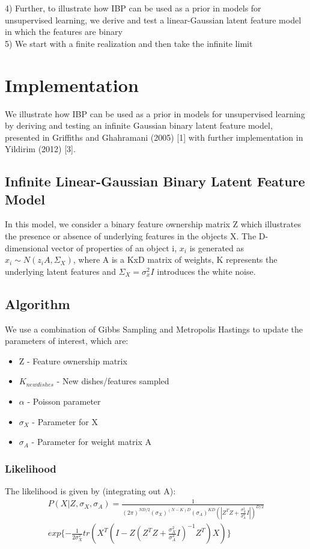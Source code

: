 \documentclass[11pt]{article}
\begin{document}
4) Further, to illustrate how IBP can be used as a prior in models for unsupervised learning, we derive and test a linear-Gaussian latent feature model in which the features are binary\\

5) We start with a finite realization and then take the infinite limit\\

\section{Implementation}
We illustrate how IBP can be used as a prior in models for unsupervised learning by deriving and testing an infinite Gaussian binary latent feature model, presented in Griffiths and Ghahramani (2005) [1] with further implementation in Yildirim (2012) [3].

\subsection{Infinite Linear-Gaussian Binary Latent Feature Model} 
In this model, we consider a binary feature ownership matrix Z which illustrates the presence or absence of underlying features in the objects X. The D-dimensional vector of properties of an object i, $x_{i}$ is generated as $x_{i} \sim N(z_{i}A, \Sigma_{X})$, where A is a KxD matrix of weights, K represents the underlying latent features and $\Sigma_{X}=\sigma_{x}^2I$ introduces the white noise.

\subsection{Algorithm}
We use a combination of Gibbs Sampling and Metropolis Hastings to update the parameters of interest, which are:

\begin{itemize}
  \item Z - Feature ownership matrix
  \item $K_{newdishes}$ - New dishes/features sampled
  \item $\alpha$ - Poisson parameter
  \item $\sigma_{X}$ - Parameter for X
  \item $\sigma_{A}$ - Parameter for weight matrix A
\end{itemize}

\subsubsection{Likelihood}
The likelihood is given by (integrating out A):
\begin{multline*}
P(X|Z,\sigma_X, \sigma_A) = \frac{1}{(2 \pi)^{ND/2} (\sigma_X)^{(N-K)D}(\sigma_A)^{KD}(|Z^TZ+\frac{\sigma_X^2}{\sigma_A^2}I|)^{D/2}}\\
exp\{-\frac{1}{2\sigma_X^2}tr(X^T(I-Z(Z^TZ+\frac{\sigma_X^2}{\sigma_A^2}I)^{-1}Z^T)X)\}
\end{multline*}
\end{document}
